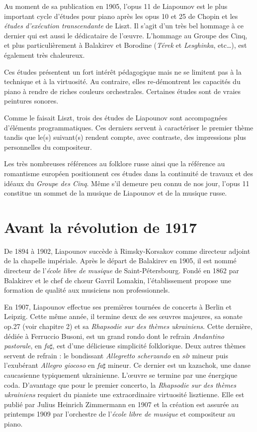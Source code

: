 Au moment de sa publication en 1905, l'opus 11 de Liapounov est le plus important cycle d'études pour piano après les opus 10 et 25 de Chopin et les \emph{études d'exécution transcendante} de Liszt. Il s'agit d'un très bel hommage à ce dernier qui est aussi le dédicataire de l'œuvre. L'hommage au Groupe des Cinq, et plus particulièrement à Balakirev et Borodine (\emph{Térek} et \emph{Lesghinka}, etc\dots), est également très chaleureux.

Ces études présentent un fort intérêt pédagogique mais ne se limitent pas à la technique et à la virtuosité. Au contraire, elles re-démontrent les capacités du piano à rendre de riches couleurs orchestrales. Certaines études sont de vraies peintures sonores.

Comme le faisait Liszt, trois des études de Liapounov sont accompagnées d'éléments programmatiques. Ces derniers servent à caractériser le premier thème tandis que le(s) suivant(s) rendent compte, avec contraste, des impressions plus personnelles du compositeur.

Les très nombreuses références au folklore russe ainsi que la référence au romantisme européen positionnent ces études dans la continuité de travaux et des idéaux du \emph{Groupe des Cinq}. Même s'il demeure peu connu de nos jour, l'opus 11 constitue un sommet de la musique de Liapounov et de la musique russe.

\newpage

\section{Avant la révolution de 1917}

De 1894 à 1902, Liapounov succède à Rimsky-Korsakov comme directeur adjoint de la chapelle impériale. Après le départ de Balakirev en 1905, il est nommé directeur de l'\emph{école libre de musique} de Saint-Pétersbourg. Fondé en 1862 par Balakirev et le chef de chœur Gavril Lomakin, l'établissement propose une formation de qualité aux musiciens non professionnels.

En 1907, Liapounov effectue ses premières tournées de concerts à Berlin et Leipzig. Cette même année, il termine deux de ses œuvres majeures, sa sonate op.27 (voir chapitre 2) et sa \emph{Rhapsodie sur des thèmes ukrainiens}. Cette dernière, dédiée à Ferruccio Busoni, est un grand rondo dont le refrain \emph{Andantino pastorale}, en \emph{fa}$\sharp$, est d'une délicieuse simplicité folklorique. Deux autres thèmes servent de refrain : le bondissant \emph{Allegretto scherzando} en \emph{si}$\flat$ mineur puis l’exubérant \emph{Allegro giocoso} en \emph{fa}$\sharp$ mineur. Ce dernier est un kazachok, une danse caucasienne typiquement ukrainienne. L'œuvre se termine par une énergique coda. D'avantage que pour le premier concerto, la \emph{Rhapsodie sur des thèmes ukrainiens} requiert du pianiste une extraordinaire virtuosité lisztienne. Elle est publié par Julius Heinrich Zimmermann en 1907 et la création est assurée au printemps 1909 par l'orchestre de l'\emph{école libre de musique} et compositeur au piano.

